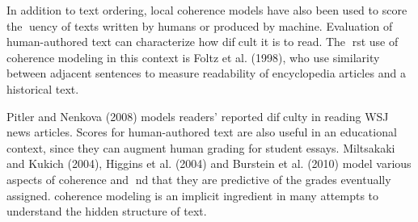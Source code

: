 In addition to text ordering, local coherence models have also been used to score the uency of texts 
written by humans or produced by machine. Evaluation of human-authored text can characterize how difcult
it is to read. The rst use of coherence modeling in this context is Foltz et al. (1998), who use similarity
between adjacent sentences to measure readability of encyclopedia articles and a historical text. 

Pitler and Nenkova (2008) models readers' reported difculty in reading WSJ news articles. 
Scores for
human-authored text are also useful in an educational context, since they can augment human grading for
student essays. Miltsakaki and Kukich (2004), Higgins et al. (2004) and Burstein et al. (2010) model various
aspects of coherence and nd that they are predictive of the grades eventually assigned.
coherence modeling is an implicit ingredient in many attempts to understand the hidden structure
of text. 



